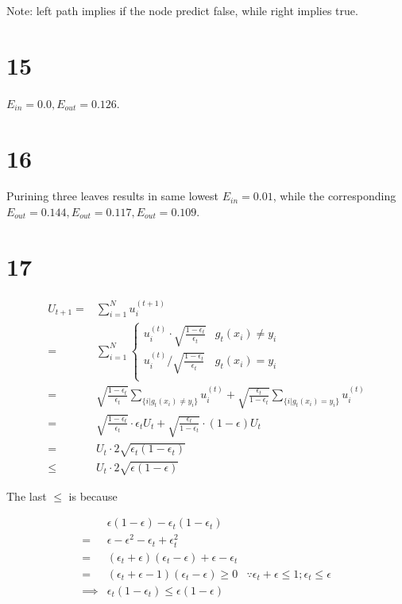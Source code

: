 \documentclass[fleqn,a4paper,12pt]{article}
\begin{document}
Note: left path implies if the node predict false, while right implies true.

\section*{15}

$E_{in} = 0.0, E_{out} = 0.126$.

\section*{16}

Purining three leaves results in same lowest $E_{in} = 0.01$, while the corresponding $E_{out} = 0.144, E_{out} = 0.117, E_{out} = 0.109$.

\section*{17}

\begin{align*}
  U_{t+1}
  =& \sum_{i=1}^N u_i^{(t + 1)} \\
  =& \sum_{i=1}^N
     \begin{cases}
       u_i^{(t)} \cdot \sqrt{\frac{1 - \epsilon_t}{\epsilon_t}} & g_t(x_i) \ne y_i\\
       u_i^{(t)} / \sqrt{\frac{1 - \epsilon_t}{\epsilon_t}} & g_t(x_i) = y_i\\
     \end{cases}
  \\
  =& \sqrt{\frac{1 - \epsilon_t}{\epsilon_t}} \sum_{\{i | g_t(x_i) \ne y_i \}} u_i^{(t)} +
     \sqrt{\frac{\epsilon_t}{1 - \epsilon_t}} \sum_{\{i | g_t(x_i) = y_i \}} u_i^{(t)} \\
  =& \sqrt{\frac{1 - \epsilon_t}{\epsilon_t}} \cdot \epsilon_t U_t +
     \sqrt{\frac{\epsilon_t}{1 - \epsilon_t}} \cdot (1 - \epsilon) U_t \\
  =& U_t \cdot 2 \sqrt{\epsilon_t (1 - \epsilon_t )} \\
  \leq& U_t \cdot 2 \sqrt{\epsilon(1 - \epsilon)}
\end{align*}

The last $\leq$ is because

\begin{align*}
  &  \epsilon(1 - \epsilon) - \epsilon_t (1 - \epsilon_t ) \\
  =& \epsilon - \epsilon^2 - \epsilon_t + \epsilon_t^2 \\
  =& (\epsilon_t + \epsilon)(\epsilon_t - \epsilon) + \epsilon - \epsilon_t \\
  =& (\epsilon_t + \epsilon - 1)(\epsilon_t - \epsilon) \geq 0
   & \because \epsilon_t + \epsilon \leq 1; \epsilon_t \leq \epsilon\\
  \implies& \epsilon_t(1 - \epsilon_t) \leq \epsilon (1 - \epsilon )
\end{align*}
\end{document}

